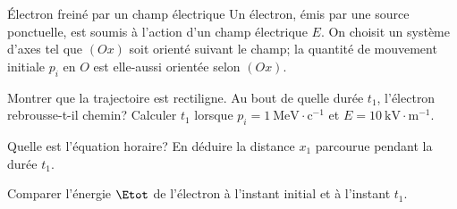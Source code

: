 \begin{exo}[PC][1][colle]{Électron freiné par un champ électrique}
    Un électron, émis par une source ponctuelle, est soumis à l'action d'un champ électrique $E$. On choisit un système d'axes tel que $(O x)$ soit orienté suivant le champ; la quantité de mouvement initiale $p_i$ en $O$ est elle-aussi orientée selon $(O x)$.
    \begin{quest}
        \item	
         Montrer que la trajectoire est rectiligne. Au bout de quelle durée $t_1$, l'électron rebrousse-t-il chemin? Calculer $t_1$ lorsque $p_i=1~\mathrm{MeV} \cdot \mathrm{c}^{-1}$ et $E=10~\mathrm{kV} \cdot \mathrm{m}^{-1}$.
        
        \item Quelle est l'équation horaire? En déduire la distance $x_1$ parcourue pendant la durée $t_1$.
        \item Comparer l'énergie $\Etot$ de l'électron à l'instant initial et à l'instant $t_1$.
    \end{quest}
\end{exo}

